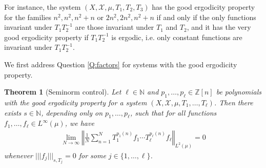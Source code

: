 \documentclass[11pt]{amsart}
\newtheorem{theorem}[lemma]{Theorem}
\theoremstyle{definition}
\newcommand{\N}{{\mathbb N}}
\newcommand{\Z}{{\mathbb Z}}
\newcommand{\CX}{{\mathcal X}}
\newcommand{\norm}[1]{\left\Vert #1\right\Vert}
\newcommand{\nnorm}[1]{\lvert\!|\!| #1|\!|\!\rvert}
\begin{document}
For instance, the system $(X, \CX, \mu, T_1, T_2, T_3)$ has the good ergodicity property for the families $n^2, n^2, n^2 + n$ or $2n^2, 2n^2, n^2+n$ if and only if the only functions invariant under $T_1 T_2^{-1}$ are those invariant under $T_1$ and $T_2$, and it has the very good ergodicity property if $T_1 T_2^{-1}$ is ergodic, i.e. only constant functions are invariant under $T_1 T_2^{-1}$.

We first address Question \ref{Q:factors} for systems with the good ergodicity property.
\begin{theorem}[Seminorm control]\label{T:Host Kra characteristic}
    Let $\ell\in\N$ and $p_1, \ldots, p_\ell\in \Z[n]$ be polynomials with the good ergodicity property for a system  $(X,\CX, \mu,T_1, \ldots, T_\ell)$. Then there exists $s\in\N$, depending only on $p_1, \ldots, p_\ell$, such that for all  functions $f_1, \ldots, f_\ell\in L^\infty(\mu)$, we have
\begin{align*}
        \lim_{N\to\infty}\norm{\frac{1}{N}\sum_{n=1}^N T_1^{p_1(n)}f_1 \cdots T_\ell^{p_\ell(n)}f_\ell}_{L^2(\mu)} = 0
\end{align*}
    whenever $\nnorm{f_j}_{s, T_j} = 0$ for some $j\in\{1, \ldots, \ell\}$.
\end{theorem}
\end{document}
